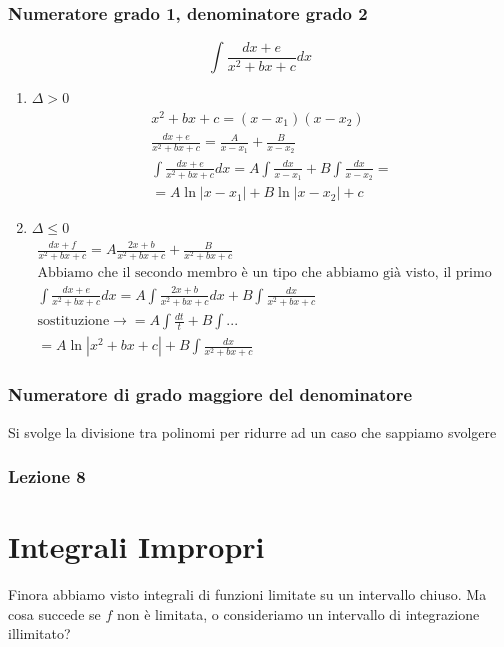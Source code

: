 \subsubsection{Numeratore grado 1, denominatore grado 2}
\begin{equation}
    \int \frac{dx + e}{x^2+bx+c}dx
\end{equation}
\begin{enumerate}
    \item $\Delta > 0$
        \begin{gather*}
            x^2+bx+c = (x-x_1)(x-x_2) \\
            \frac{dx + e}{x^2+bx+c} = \frac{A}{x-x_1}+ \frac{B}{x-x_2} \\
            \int \frac{dx + e}{x^2+bx+c}dx = A\int \frac{dx}{x-x_1} + B\int \frac{dx}{x-x_2} = \\
            = A\ln|x-x_1| + B\ln|x-x_2| + c
        \end{gather*}
    \item $\Delta \leq 0$
        \begin{gather*}
            \frac{dx+f}{x^2+bx+c} = A\frac{2x+b}{x^2+bx+c}+ \frac{B}{x^2+bx+c} \\
            \text{Abbiamo che il secondo membro è un tipo che abbiamo già visto, il primo ha la derivata del denominatore al numeratore} \\
            \int \frac{dx + e}{x^2+bx+c}dx = A\int \frac{2x+b}{x^2+bx+c}dx + B\int\frac{dx}{x^2+bx+c} \\
            \text{sostituzione} \rightarrow = A\int \frac{dt}{t} + B\int ...\\
            = A\ln|x^2+bx+c|+ B\int \frac{dx}{x^2+bx+c}
        \end{gather*}
\end{enumerate}

\subsubsection{Numeratore di grado maggiore del denominatore}
Si svolge la divisione tra polinomi per ridurre ad un caso che sappiamo svolgere

\subsubsection{Lezione 8}
\section{Integrali Impropri}
Finora abbiamo visto integrali di funzioni limitate su un intervallo chiuso. Ma cosa succede se $f$ non è limitata, o consideriamo un intervallo di integrazione illimitato?

